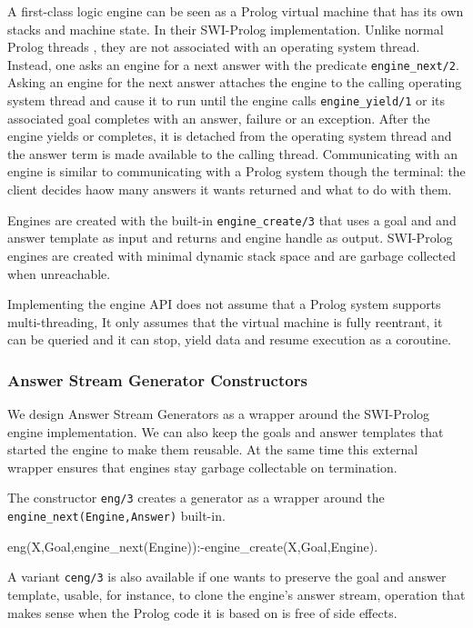 \documentclass{new_tlp}
\begin{document}
A first-class logic engine \cite{tarau:cl2000,bp2011} can be seen as a Prolog virtual machine that has its own stacks and machine state. 
In their SWI-Prolog implementation. Unlike normal Prolog threads \cite{swi,swi_threads}, they are not associated with an operating system thread. Instead, one asks an engine for a next answer with the predicate {\tt engine\_next/2}. Asking an engine for the next answer attaches the engine to the calling operating system thread and cause it to run until the engine calls {\tt engine\_yield/1} or its associated goal completes with an answer, failure or an exception. After the engine yields or completes, it is detached from the operating system thread and the answer term is made available to the calling thread. Communicating with an engine is similar to communicating with a Prolog system though the terminal: the client decides haow many answers it wants returned and what to do with them.  

Engines are created with the built-in {\tt engine\_create/3} that uses a goal and and answer template as input and returns and engine handle as output. SWI-Prolog engines are created with minimal dynamic stack space and are garbage collected when unreachable.

Implementing the engine API does not assume that a Prolog system supports multi-threading, It only assumes that the virtual machine is fully reentrant, it can be queried and it can stop, yield data and resume execution as a coroutine.

\begin{comment}
As Prolog virtual machines, engines have  an internal state. Thus interacting with them requires a concise and expressive, but ultimately procedural API. This is not very different from what working with attributed variables, instrumental to adding constraint solvers, requires.
\end{comment}

\subsubsection{Answer Stream Generator Constructors}

We design Answer Stream Generators as a wrapper around the SWI-Prolog engine implementation.
We can also keep the goals and answer templates that started the engine to make them reusable. At the same time this external wrapper ensures that engines stay garbage collectable on termination.

The constructor {\tt eng/3} creates a generator as a wrapper around
the {\tt engine\_next(Engine,Answer)} built-in.
\begin{code}
eng(X,Goal,engine_next(Engine)):-engine_create(X,Goal,Engine). 
\end{code}
A variant {\tt ceng/3} is also available if one wants to preserve
the goal and answer template, usable, for instance, to clone
the engine's answer stream, 
operation that makes sense when the Prolog code it is based on 
is free of side effects.
\end{document}
